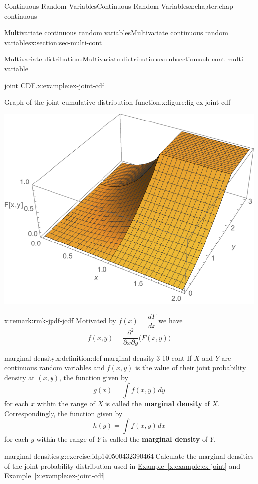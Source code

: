 \documentclass[oneside,10pt,]{book}
\newcommand{\xreffont}{\relax}
\newcommand{\terminology}[1]{\textbf{#1}}
\begin{document}
\begin{chapterptx}{Continuous Random Variables}{}{Continuous Random Variables}{}{}{x:chapter:chap-continuous}
\begin{sectionptx}{Multivariate continuous random variables}{}{Multivariate continuous random variables}{}{}{x:section:sec-multi-cont}
\begin{subsectionptx}{Multivariate distributions}{}{Multivariate distributions}{}{}{x:subsection:sub-cont-multi-variable}
\begin{example}{joint CDF.}{x:example:ex-joint-cdf}
\begin{figureptx}{Graph of the joint cumulative distribution function.}{x:figure:fig-ex-joint-cdf}{}
\begin{image}{0.25}{0.5}{0.25}
\includegraphics[width=\linewidth]{./images/big_F.png}
\end{image}%
\tcblower
\end{figureptx}%
\end{example}
\begin{remark}{}{x:remark:rmk-jpdf-jcdf}%
Motivated by \(f(x) = \dfrac{dF}{dx}\) we have%
\begin{equation*}
f(x, y) = \dfrac{\partial^2}{\partial x \partial y}\Big(F(x, y)\Big)
\end{equation*}
%
\end{remark}
\begin{definition}{marginal density.}{x:definition:def-marginal-density-3-10-cont}%
If \(X\) and \(Y\) are continuous random variables and \(f(x,
y)\) is the value of their joint probability density at \((x, y)\), the function given by%
\begin{equation*}
g(x) = \int f(x, y)\, dy
\end{equation*}
for each \(x\) within the range of \(X\) is called the \terminology{marginal density} of \(X\). Correspondingly, the function given by%
\begin{equation*}
h(y) = \int f(x, y)\,dx
\end{equation*}
for each \(y\) within the range of \(Y\) is called the \terminology{marginal density} of \(Y\).%
\end{definition}
\begin{inlineexercise}{marginal densities.}{g:exercise:idp140500432390464}%
Calculate the marginal densities of the joint probability distribution used in \hyperref[x:example:ex-joint]{Example~{\xreffont\ref{x:example:ex-joint}}} and \hyperref[x:example:ex-joint-cdf]{Example~{\xreffont\ref{x:example:ex-joint-cdf}}}%

\end{inlineexercise}
\end{subsectionptx}
\end{sectionptx}
\end{chapterptx}
\end{document}

